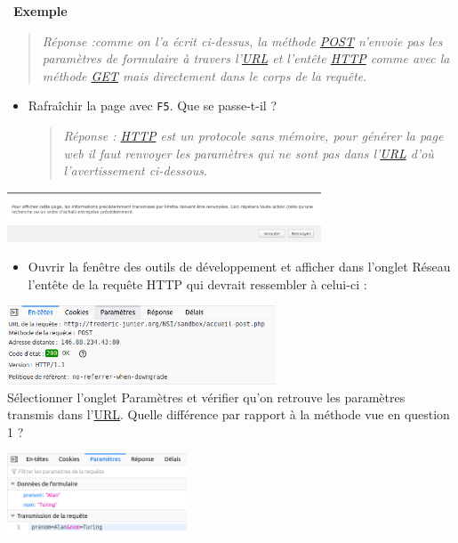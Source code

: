 \documentclass[
  11pt,
]{article}
\newcommand{\passthrough}[1]{#1}
\providecommand{\tightlist}{%
  \setlength{\itemsep}{0pt}\setlength{\parskip}{0pt}}
\newcounter{exple}
\newenvironment{exemple}[1]
{\par \medskip   \addtocounter{exple}{1} \noindent  
\begin{bclogo}[arrondi =0.1,   noborder = true, logo=\bclampe, marge=4]{~\textbf{Exemple} \textbf{\theexple} {\itshape #1} }  \par}
{
\end{bclogo}
 \par \bigskip }
\begin{document}
\begin{exemple}{}
\begin{enumerate}
  \begin{quote}
  \emph{Réponse :comme on l'a écrit ci-dessus, la méthode \url{POST}
  n'envoie pas les paramètres de formulaire à travers l'\url{URL} et
  l'entête \url{HTTP} comme avec la méthode \url{GET} mais directement
  dans le corps de la requête}.
  \end{quote}

  \begin{itemize}
  \item
    Rafraîchir la page avec \passthrough{\lstinline!F5!}. Que se
    passe-t-il ?

    \begin{quote}
    \emph{Réponse : \url{HTTP} est un protocole sans mémoire, pour
    générer la page web il faut renvoyer les paramètres qui ne sont pas
    dans l'\url{URL} d'où l'avertissement ci-dessous.}
    \end{quote}
  \end{itemize}

  \includegraphics[width=0.7\textwidth,height=\textheight]{images/avertissement-post.png}\\

  \begin{itemize}
  \tightlist
  \item
    Ouvrir la fenêtre des outils de développement et afficher dans
    l'onglet Réseau l'entête de la requête HTTP qui devrait ressembler à
    celui-ci :
  \end{itemize}

  \includegraphics[width=0.6\textwidth,height=\textheight]{images/entete-post.png}\\

  Sélectionner l'onglet Paramètres et vérifier qu'on retrouve les
  paramètres transmis dans
  l'\href{https://developer.mozilla.org/fr/docs/Glossaire/URL}{URL}.
  Quelle différence par rapport à la méthode vue en question 1 ?

  \includegraphics[width=0.4\textwidth,height=\textheight]{images/parametres2.png}\\


\end{enumerate}
\end{exemple}
\end{document}
